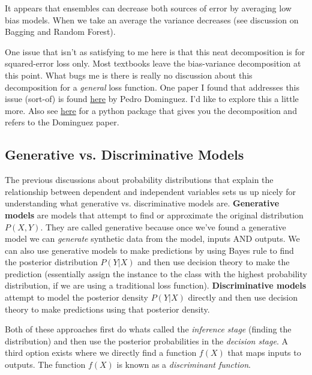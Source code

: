 It appears that ensembles can decrease both sources of error by averaging low bias models. When we take an average the variance decreases (see discussion on Bagging and Random Forest).

One issue that isn't as satisfying to me here is that this neat decomposition is for squared-error loss only. Most textbooks leave the bias-variance decomposition at this point. What bugs me is there is really no discussion about this decomposition for a \emph{general} loss function. One paper I found that addresses this issue (sort-of) is found \href{https://homes.cs.washington.edu/~pedrod/bvd.pdf}{here} by Pedro Dominguez. I'd like to explore this a little more. Also see \href{https://github.com/rasbt/mlxtend/blob/master/docs/sources/user_guide/evaluate/bias_variance_decomp.ipynb?utm_campaign=Data_Elixir&utm_source=Data_Elixir_210}{here} for a python package that gives you the decomposition and refers to the Dominguez paper.




\subsection{Generative vs. Discriminative Models}

The previous discussions about probability distributions that explain the relationship between dependent and independent variables sets us up nicely for understanding what generative vs. discriminative models are. \textbf{Generative models} are models that attempt to find or approximate the original distribution $P(X,Y)$. They are called generative because once we've found a generative model we can \emph{generate} synthetic data from the model, inputs AND outputs. We can also use generative models to make predictions by using Bayes rule to find the posterior distribution $P(Y|X)$ and then use decision theory to make the prediction (essentially assign the instance to the class with the highest probability distribution, if we are using a traditional loss function). \textbf{Discriminative models} attempt to model the posterior density $P(Y|X)$ directly and then use decision theory to make predictions using that posterior density. 

Both of these approaches first do whats called the \emph{inference stage} (finding the distribution) and then use the posterior probabilities in the \emph{decision stage}. A third option exists where we directly find a function $f(X)$ that maps inputs to outputs. The function $f(X)$ is known as a \emph{discriminant function}.

